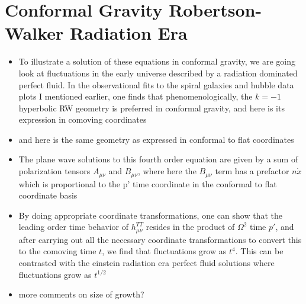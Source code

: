\documentclass[10pt,letterpaper]{article}
\numberwithin{equation}{section}
\begin{document}
\section{Conformal Gravity Robertson-Walker Radiation Era}
\begin{itemize}
	\item To illustrate a solution of these equations in conformal gravity, we are going look at fluctuations in the early universe described by a radiation dominated perfect fluid. In the observational fits to the spiral galaxies and hubble data plots I mentioned earlier, one finds that phenomenologically, the $k=-1$ hyperbolic RW geometry is preferred in conformal gravity, and here is its expression in comoving coordinates
	\item and here is the same geometry as expressed in conformal to flat coordinates
	\item The plane wave solutions to this fourth order equation are given by a sum of polarization tensors $A_{\mu\nu}$ and $B_{\mu\nu}$, where here the $B_{\mu\nu}$ term has a prefactor $n\dot x$ which is proportional to the p' time coordinate in the conformal to flat coordinate basis
	\item By doing appropriate coordinate transformations, one can show that the leading order time behavior of $h_{\mu\nu}^{TT}$ resides in the product of $\Omega^2$ time $p'$, and after carrying out all the necessary coordinate transformations to convert this to the comoving time $t$, we find that fluctuations grow as $t^4$. This can be contrasted with the einstein radiation era perfect fluid solutions where fluctuations grow as $t^{1/2}$
	\item more comments on size of growth? 
\end{itemize}

\end{document}

